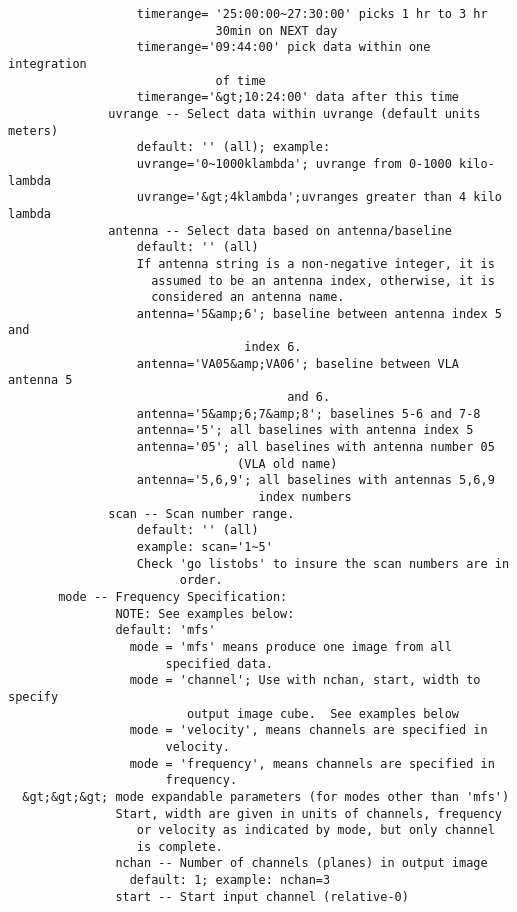 \begin{verbatim}
                  timerange= '25:00:00~27:30:00' picks 1 hr to 3 hr 
                             30min on NEXT day
                  timerange='09:44:00' pick data within one integration 
                             of time
                  timerange='&gt;10:24:00' data after this time
              uvrange -- Select data within uvrange (default units meters)
                  default: '' (all); example:
                  uvrange='0~1000klambda'; uvrange from 0-1000 kilo-lambda
                  uvrange='&gt;4klambda';uvranges greater than 4 kilo lambda
              antenna -- Select data based on antenna/baseline
                  default: '' (all)
                  If antenna string is a non-negative integer, it is 
                    assumed to be an antenna index, otherwise, it is
                    considered an antenna name.
                  antenna='5&amp;6'; baseline between antenna index 5 and 
                                 index 6.
                  antenna='VA05&amp;VA06'; baseline between VLA antenna 5 
                                       and 6.
                  antenna='5&amp;6;7&amp;8'; baselines 5-6 and 7-8
                  antenna='5'; all baselines with antenna index 5
                  antenna='05'; all baselines with antenna number 05 
                                (VLA old name)
                  antenna='5,6,9'; all baselines with antennas 5,6,9 
                                   index numbers
              scan -- Scan number range.
                  default: '' (all)
                  example: scan='1~5'
                  Check 'go listobs' to insure the scan numbers are in 
                        order.
       mode -- Frequency Specification:
               NOTE: See examples below:
               default: 'mfs'
                 mode = 'mfs' means produce one image from all 
                      specified data.
                 mode = 'channel'; Use with nchan, start, width to specify
                         output image cube.  See examples below
                 mode = 'velocity', means channels are specified in 
                      velocity.
                 mode = 'frequency', means channels are specified in 
                      frequency.
  &gt;&gt;&gt; mode expandable parameters (for modes other than 'mfs')
               Start, width are given in units of channels, frequency 
                  or velocity as indicated by mode, but only channel
                  is complete.
               nchan -- Number of channels (planes) in output image
                 default: 1; example: nchan=3
               start -- Start input channel (relative-0)

\end{verbatim}
